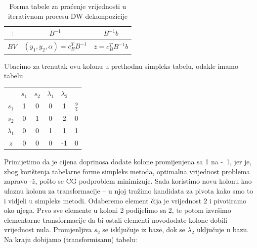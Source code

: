 \documentclass[b5paper, utf8, 11pt, colorlinks]{book}
\theoremstyle{definition}
\begin{document}
  \begin{table}\centering
 	\begin{tabular}{|c|c|c|} \hline
 		$\vdots$ & 	$B^{-1}$& $B^{-1}b$ \\
 		\hline
 		$BV$ &	$(y_1,y_2,\alpha)=c^T_B B^{-1}$ & $\overline{z}= c^T_B B^{-1}b$ \\	
 		\hline
 	\end{tabular}\caption{Forma tabele za praćenje vrijednosti u iterativnom procesu DW dekompozicije}\label{tbl:dw1}
 \end{table}
 
 

Ubacimo za trenutak ovu kolonu u prethodnu simpleks tabelu, odakle imamo tabelu

 \begin{center}
 	
 	\begin{tabular}{c|ccccc}
 	                &$s_1$        & $ s_2$   &  $\lambda_1$ & $\lambda_2$   &                \\
 		$s_1$	    &   1      &    0         &   0         &     1         &  $\frac{9}{4}$ \\
 		$s_2$	    &   0      &    1         &   0         &     2         &  0             \\
 		$\lambda_1$ &   0      &    0         &   1         &     1         &  1             \\ \hline
 		$z$         &   0      &    0         &   0         &    -1         &  0
 	\end{tabular}
 \end{center}
Primijetimo da je cijena doprinosa dodate kolone promijenjena sa 1 na -~1, jer je, zbog korištenja tabelarne forme simpleks metoda, optimalna vrijednost problema zapravo -$\hat{z}$, pošto se CG podproblem minimizuje. Sada koristimo novu kolonu kao ulaznu kolonu za transformacije -- u njoj tražimo kandidata za pivota kako smo to i vidjeli u simpleks metodi. Odaberemo element čija je vrijednost $2$ i pivotiramo oko njega. Prvo sve elemente u koloni 2 podijelimo sa 2, te potom izvršimo elementarne transformacije da bi ostali elementi novododate kolone dobili vrijednost nula. Promjenljiva $s_2$ se isključuje iz baze, dok se $\lambda_2$ uključuje u bazu. Na kraju dobijamo (transformisanu) tabelu:
\end{document}
